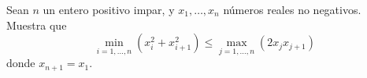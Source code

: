 Sean $n$ un entero positivo impar, y $x_1, \dots, x_n$ números reales no negativos. Muestra
que
\[ \min_{i=1,\ldots,n} (x_i^2+x_{i+1}^2) \leq \max_{j=1,\ldots,n} (2x_jx_{j+1}) \]
donde $x_{n+1}= x_1$.